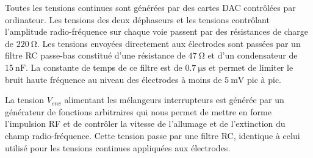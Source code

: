 Toutes les tensions continues sont générées par des cartes DAC contrôlées par ordinateur.
Les tensions des deux déphaseurs et les tensions contrôlant l'amplitude radio-fréquence sur chaque voie passent par des résistances de charge de $\SI{220}{\ohm}$.
Les tensions envoyées directement aux électrodes sont passées par un filtre RC passe-bas constitué d'une résistance de $\SI{47}{\ohm}$ et d'un condensateur de $\SI{15}{\nano\farad}$.
La constante de temps de ce filtre est de $\SI{0.7}{\us}$ et permet de limiter le bruit haute fréquence au niveau des électrodes à moins de $\SI{5}{\milli\volt}$ pic à pic.

La tension $V_{env}$ alimentant les mélangeurs \og interrupteurs \fg{} est générée par un générateur de fonctions arbitraires qui nous permet de mettre en forme l'impulsion RF et de contrôler la vitesse de l'allumage et de l'extinction du champ radio-fréquence.
Cette tension passe par une filtre RC, identique à celui utilisé pour les tensions continues appliquées aux électrodes.


